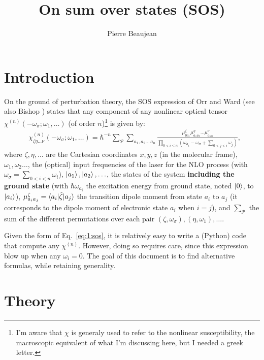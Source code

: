 \documentclass[12pt,a4paper]{article}
\title{On sum over states (SOS)}
\author{Pierre Beaujean}
\begin{document}
\maketitle

\allowdisplaybreaks
\onehalfspacing

\section{Introduction}

On the ground of perturbation theory, 
the SOS expression of Orr and Ward \cite{orrPerturbationTheoryNonlinear1971} (see also Bishop \cite{bishopExplicitNondivergentFormulas1994}) states that any component of any nonlinear optical tensor $\chi^{(n)}(-\omega_\sigma;\omega_1,\ldots)$ (of order $n$)\footnote{I'm aware that $\chi$ is generaly used to refer to the nonlinear susceptibility, the macroscopic equivalent of what I'm discussing here, but I needed a greek letter.} is given by:\begin{align}
&\chi^{(n)}_{\zeta\eta\ldots\nu}(-\omega_\sigma;\omega_1,\ldots) = \hbar^{-n}\sum_\mathcal{P}\sum_{a_1,a_2\ldots\,a_{n}} \frac{\mu^\zeta_{0a_1}{\mu}^\eta_{a_1a_2}\ldots \mu^\nu_{a_{n\,0}}}{\prod_{0<i\leq n} (\omega_{a_i}-\omega_\sigma+\sum_{0<j<i} \omega_j)},\label{eq:1:sos}
\end{align}
where $\zeta,\eta,\ldots$ are the Cartesian coordinates $x, y, z$ (in the molecular frame), $\omega_1, \omega_2\ldots$, the (optical) input frequencies of the laser for the NLO process (with $\omega_\sigma = \sum_{0<i<n} \omega_i$), $\ket{a_1}, \ket{a_2}, \ldots$, the states of the system  \textbf{including the ground state} (with $\hbar\omega_{a_i}$ the excitation energy from ground state, noted  $\ket{0}$, to $\ket{a_i}$), $\mu^\zeta_{a_ia_j} = \braket{a_i|\hat \zeta|a_j}$ the transition dipole moment from state $a_i$ to $a_j$ (it corresponds to the dipole moment of electronic state $a_i$ when $i=j$), and $\sum_\mathcal{P}$ the sum of the different permutations over each pair $(\zeta, \omega_\sigma),(\eta,\omega_1),\ldots$. 

Given the form of Eq.~\eqref{eq:1:sos}, it is relatively easy to write a (Python) code that compute any $\chi^{(n)}$. However, doing so requires care, since this expression blow up when any $\omega_i = 0$. The goal of this document is to find alternative formulas, while retaining generality.

\section{Theory}
\end{document}
